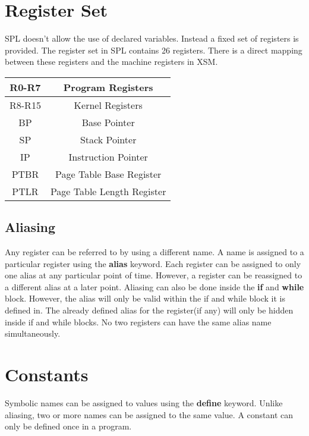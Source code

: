 \documentclass[11pt]{article}
\begin{document}
\section{Register Set}

SPL doesn't allow the use of declared variables. Instead a fixed set of registers is provided. The register set in SPL contains 26 registers. There is a direct mapping between these registers and the machine registers in XSM.   \\

\begin{center}
\begin{tabular}{| c | c | }
\hline
R0-R7 & Program Registers \\
\hline
R8-R15 & Kernel Registers \\
\hline
BP 		& Base Pointer \\
\hline
SP		& Stack Pointer \\
\hline
IP		& Instruction Pointer \\
\hline
PTBR	& Page Table Base Register \\
\hline
PTLR & Page Table Length Register \\
\hline
\end{tabular}
\end{center}

\subsection{Aliasing}
Any register can be referred to by using a different name. A name is assigned to a particular register using the \textbf{alias} keyword. Each register can be assigned to only one alias at any particular point of time. However, a  register can be reassigned to a different alias at a later point. Aliasing can also be done inside the \textbf{if} and \textbf{while} block. However, the alias will only be valid within the if and while block it is defined in. The already defined alias for the register(if any) will only be hidden inside if and while blocks. No two registers can have the same alias name simultaneously.



\section{Constants}
Symbolic names can be assigned to values using the \textbf{define} keyword. Unlike aliasing, two or more names can be assigned to the same value. A constant can only be defined once in a program.
	
\end{document}
